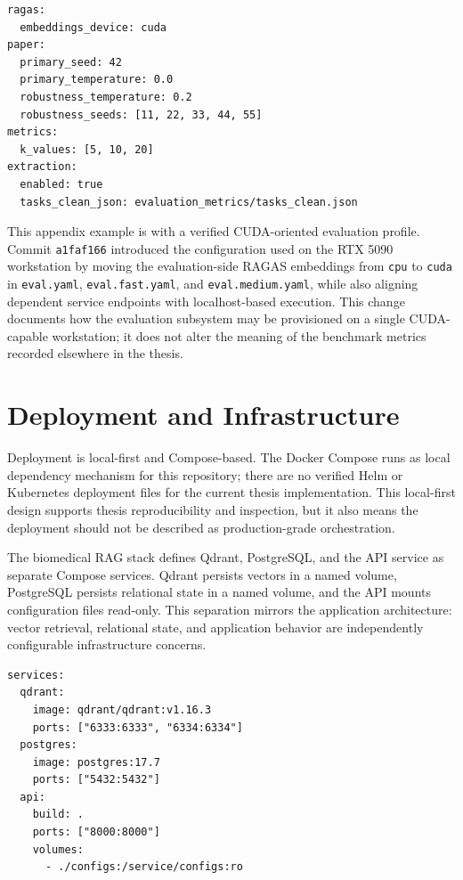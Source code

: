 \begin{lstlisting}[language={},caption={Representative evaluation settings.}]
ragas:
  embeddings_device: cuda
paper:
  primary_seed: 42
  primary_temperature: 0.0
  robustness_temperature: 0.2
  robustness_seeds: [11, 22, 33, 44, 55]
metrics:
  k_values: [5, 10, 20]
extraction:
  enabled: true
  tasks_clean_json: evaluation_metrics/tasks_clean.json
\end{lstlisting}

This appendix example is with a verified CUDA-oriented evaluation profile. Commit \texttt{a1faf166} introduced the configuration used on the RTX 5090 workstation by moving the evaluation-side RAGAS embeddings from \texttt{cpu} to \texttt{cuda} in \texttt{eval.yaml}, \texttt{eval.fast.yaml}, and \texttt{eval.medium.yaml}, while also aligning dependent service endpoints with localhost-based execution. This change documents how the evaluation subsystem may be provisioned on a single CUDA-capable workstation; it does not alter the meaning of the benchmark metrics recorded elsewhere in the thesis.

\section{Deployment and Infrastructure}

Deployment is local-first and Compose-based. The Docker Compose runs as local dependency mechanism for this repository; there are no verified Helm or Kubernetes deployment files for the current thesis implementation. This local-first design supports thesis reproducibility and inspection, but it also means the deployment should not be described as production-grade orchestration.

The biomedical RAG stack defines Qdrant, PostgreSQL, and the API service as separate Compose services. Qdrant persists vectors in a named volume, PostgreSQL persists relational state in a named volume, and the API mounts configuration files read-only. This separation mirrors the application architecture: vector retrieval, relational state, and application behavior are independently configurable infrastructure concerns.

\begin{lstlisting}[language={},caption={Representative biomedical RAG Compose services.}]
services:
  qdrant:
    image: qdrant/qdrant:v1.16.3
    ports: ["6333:6333", "6334:6334"]
  postgres:
    image: postgres:17.7
    ports: ["5432:5432"]
  api:
    build: .
    ports: ["8000:8000"]
    volumes:
      - ./configs:/service/configs:ro
\end{lstlisting}

